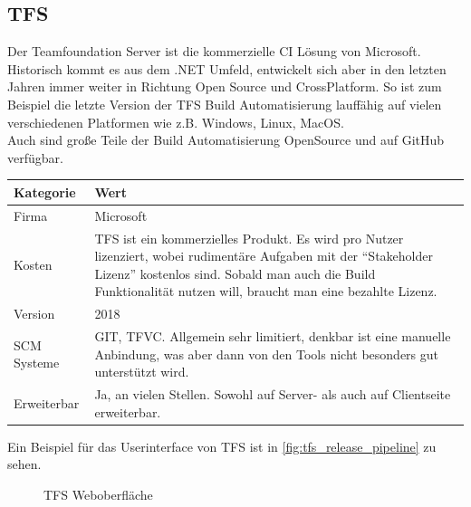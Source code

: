 \subsection{TFS}
Der Teamfoundation Server ist die kommerzielle CI Lösung von Microsoft. Historisch kommt es aus dem .NET Umfeld, entwickelt sich aber in den letzten Jahren immer weiter in Richtung Open Source und CrossPlatform. So ist zum Beispiel die letzte Version der TFS Build Automatisierung lauffähig auf vielen verschiedenen Platformen wie z.B. Windows, Linux, MacOS.\\
Auch sind große Teile der Build Automatisierung OpenSource und auf GitHub verfügbar.
\begin{center}
  \begin{tabularx}{\textwidth}{lX}
    \toprule
    Kategorie & Wert \\
    \midrule
    Firma &  Microsoft \\
		\addlinespace
    Kosten & TFS ist ein kommerzielles Produkt. Es wird pro Nutzer lizenziert, wobei rudimentäre Aufgaben mit der "`Stakeholder Lizenz"' kostenlos sind. Sobald man auch die Build Funktionalität nutzen will, braucht man eine bezahlte Lizenz.\\
		\addlinespace
		Version & 2018 \\
		\addlinespace
		SCM Systeme & GIT, TFVC. Allgemein sehr limitiert, denkbar ist eine manuelle Anbindung, was aber dann von den Tools nicht besonders gut unterstützt wird.\\
		\addlinespace
		Erweiterbar & Ja, an vielen Stellen. Sowohl auf Server- als auch auf Clientseite erweiterbar.\\
    \bottomrule
  \end{tabularx}
\end{center}
Ein Beispiel für das Userinterface von TFS ist in \autoref{fig:tfs_release_pipeline} zu sehen. 

\begin{figure}[H]
  \centering
  \caption{TFS Weboberfläche \cite{TFS-Marketing}}\label{fig:tfs_release_pipeline}
\end{figure}
